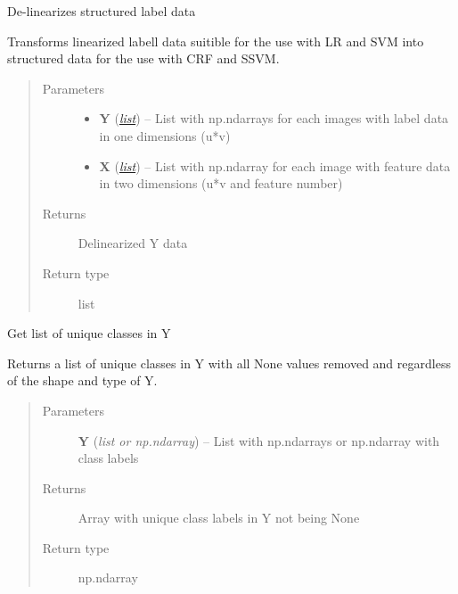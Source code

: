 \documentclass[letterpaper,10pt,english]{sphinxmanual}
\begin{document}
\begin{fulllineitems}
\label{classification:flamingo.classification.utils.delinearize_data}
De-linearizes structured label data

Transforms linearized labell data suitible for the use with LR
and SVM into structured data for the use with CRF and SSVM.
\begin{quote}\begin{description}
\item[{Parameters}] \leavevmode\begin{itemize}
\item {} 
\textbf{Y} (\href{http://docs.python.org/library/functions.html\#list}{\emph{list}}) -- List with np.ndarrays for each images with label data in one
dimensions (u*v)

\item {} 
\textbf{X} (\href{http://docs.python.org/library/functions.html\#list}{\emph{list}}) -- List with np.ndarray for each image with feature data in two
dimensions (u*v and feature number)

\end{itemize}

\item[{Returns}] \leavevmode
Delinearized Y data

\item[{Return type}] \leavevmode
list

\end{description}\end{quote}

\end{fulllineitems}


\begin{fulllineitems}
\label{classification:flamingo.classification.utils.get_classes}
Get list of unique classes in Y

Returns a list of unique classes in Y with all None values removed
and regardless of the shape and type of Y.
\begin{quote}\begin{description}
\item[{Parameters}] \leavevmode
\textbf{Y} (\emph{list or np.ndarray}) -- List with np.ndarrays or np.ndarray with class labels

\item[{Returns}] \leavevmode
Array with unique class labels in Y not being None

\item[{Return type}] \leavevmode
np.ndarray

\end{description}\end{quote}

\end{fulllineitems}
\end{document}
